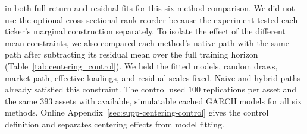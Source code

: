 in both full-return and residual fits for this six-method comparison.
We did not use the optional cross-sectional rank reorder because the
experiment tested each ticker's marginal construction separately.
To isolate the effect of the different mean constraints, we also
compared each method's native path with the same path after subtracting
its residual mean over the full training horizon
(Table~\ref{tab:centering_control}). We held the fitted models,
random draws, market path, effective loadings, and residual scales
fixed. Naive and hybrid paths already satisfied this constraint.
The control used $100$ replications per asset and the same $393$
assets with available, simulatable cached GARCH models for all six
methods. Online Appendix~\ref{sec:supp-centering-control} gives the
control definition and separates centering effects from model fitting.

